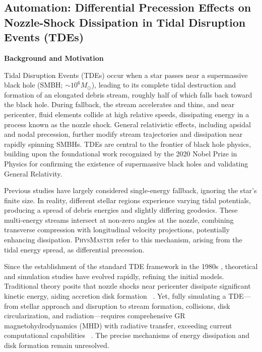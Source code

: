 \documentclass[11pt, a4paper, logo, copyright, nonumbering]{SAI}
\newcommand{\agent}{\textsc{PhysMaster}\xspace}
\begin{document}
\newpage
\subsection{Automation: Differential Precession Effects on Nozzle-Shock Dissipation in Tidal Disruption Events (TDEs)}

\noindent \textbf{Background and Motivation}

Tidal Disruption Events (TDEs) occur when a star passes near a supermassive black hole (SMBH; $\sim 10^6 M_\odot$), leading to its complete tidal destruction and formation of an elongated debris stream, roughly half of which falls back toward the black hole. During fallback, the stream accelerates and thins, and near pericenter, fluid elements collide at high relative speeds, dissipating energy in a process known as the nozzle shock. General relativistic effects, including apsidal and nodal precession, further modify stream trajectories and dissipation near rapidly spinning SMBHs. TDEs are central to the frontier of black hole physics, building upon the foundational work recognized by the 2020 Nobel Prize in Physics for confirming the existence of supermassive black holes and validating General Relativity.

Previous studies have largely considered single-energy fallback, ignoring the star's finite size. In reality, different stellar regions experience varying tidal potentials, producing a spread of debris energies and slightly differing geodesics. These multi-energy streams intersect at non-zero angles at the nozzle, combining transverse compression with longitudinal velocity projections, potentially enhancing dissipation. \agent refer to this mechanism, arising from the tidal energy spread, as differential precession.

Since the establishment of the standard TDE framework in the 1980s \citep{carter1983tidal}, theoretical and simulation studies have evolved rapidly, refining the initial models. Traditional theory posits that nozzle shocks near pericenter dissipate significant kinetic energy, aiding accretion disk formation ~\citep{evans1989tidal,shiokawa2015general}. Yet, fully simulating a TDE---from stellar approach and disruption to stream formation, collisions, disk circularization, and radiation---requires comprehensive GR magnetohydrodynamics (MHD) with radiative transfer, exceeding current computational capabilities ~\citep{dai2018unified,curd2019grrmhd}. The precise mechanisms of energy dissipation and disk formation remain unresolved.
\end{document}
